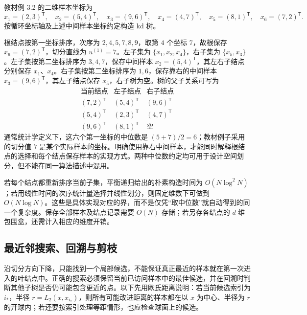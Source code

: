 \begin{example}
\label{ex:lihang-knn-kdtree-build}
教材例 3.2 的二维样本坐标为
\[
  x_1=(2,3)^\mathsf T,\quad x_2=(5,4)^\mathsf T,\quad
  x_3=(9,6)^\mathsf T,\quad x_4=(4,7)^\mathsf T,\quad
  x_5=(8,1)^\mathsf T,\quad x_6=(7,2)^\mathsf T.
\]
按循环坐标轴及上述中间样本坐标约定构造 kd 树。
\end{example}
\begin{solve}
根结点按第一坐标排序，次序为 $2,4,5,7,8,9$，取第 $4$ 个坐标 $7$，故根保存 $x_6=(7,2)^\mathsf T$，切分直线为 $u^{(1)}=7$。左子集为 $\{x_1,x_2,x_4\}$，右子集为 $\{x_5,x_3\}$。左子集按第二坐标排序为 $3,4,7$，保存中间样本 $x_2=(5,4)^\mathsf T$，其左右子结点分别保存 $x_1$、$x_4$。右子集按第二坐标排序为 $1,6$，保存靠右的中间样本 $x_3=(9,6)^\mathsf T$，其左子结点保存 $x_5$，右子树为空。树的父子关系可写为
\[
  \begin{array}{c|c|c}
    \text{当前结点}&\text{左子结点}&\text{右子结点}\\ \hline
    (7,2)^\mathsf T&(5,4)^\mathsf T&(9,6)^\mathsf T\\
    (5,4)^\mathsf T&(2,3)^\mathsf T&(4,7)^\mathsf T\\
    (9,6)^\mathsf T&(8,1)^\mathsf T&\text{空}
  \end{array}
\]
通常统计学定义下，这六个第一坐标的中位数是 $(5+7)/2=6$；教材例子采用的切分值 $7$ 是某个实际样本的坐标。明确使用靠右中间样本，才能同时解释根结点的选择和每个结点保存样本的实现方式。两种中位数约定均可用于设计空间划分，但不能在同一算法描述中混用。
\end{solve}

若每个结点都重新排序当前子集，平衡递归给出的朴素构造时间为 $O(N\log^2 N)$；若用线性时间的次序统计量选择并线性划分，则固定维数下可做到 $O(N\log N)$。这些是具体实现对应的界，而不是仅凭“取中位数”就自动得到的同一个复杂度。保存全部样本及结点记录需要 $O(N)$ 存储；若另存各结点的 $d$ 维包围盒，还需计入相应的维度开销。

\subsection{最近邻搜索、回溯与剪枝}
\label{subsec:lihang-knn-kdtree-search}

沿切分方向下降，只能找到一个局部候选，不能保证真正最近的样本就在第一次进入的叶结点中。正确的搜索必须保留当前已访问样本中的最佳候选，并在回溯时判断其他子树是否仍可能包含更近的点。以下先用欧氏距离说明：若当前候选索引为 $i_\ast$，半径 $r=L_2(x,x_{i_\ast})$，则所有可能改进距离的样本都在以 $x$ 为中心、半径为 $r$ 的开球内；若还要按索引处理等距情形，也应检查球面上的候选。


